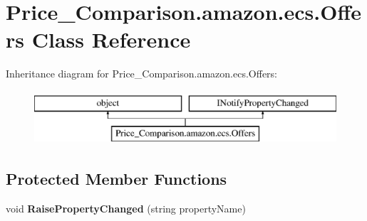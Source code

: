 \hypertarget{class_price___comparison_1_1amazon_1_1ecs_1_1_offers}{\section{Price\-\_\-\-Comparison.\-amazon.\-ecs.\-Offers Class Reference}
\label{class_price___comparison_1_1amazon_1_1ecs_1_1_offers}
}


 


Inheritance diagram for Price\-\_\-\-Comparison.\-amazon.\-ecs.\-Offers\-:\begin{figure}[H]
\begin{center}
\leavevmode
\includegraphics[height=2.000000cm]{class_price___comparison_1_1amazon_1_1ecs_1_1_offers}
\end{center}
\end{figure}
\subsection*{Protected Member Functions}
\begin{DoxyCompactItemize}
\item 
\hypertarget{class_price___comparison_1_1amazon_1_1ecs_1_1_offers_aa94e58a2334d64b91091b74228b51ca9}{void {\bfseries Raise\-Property\-Changed} (string property\-Name)}\label{class_price___comparison_1_1amazon_1_1ecs_1_1_offers_aa94e58a2334d64b91091b74228b51ca9}

\end{DoxyCompactItemize}
